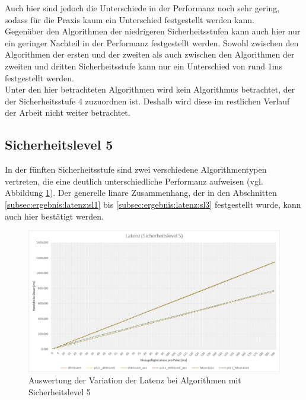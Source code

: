 		Auch hier sind jedoch die Unterschiede in der Performanz noch sehr gering, sodass für die Praxis kaum 				ein Unterschied festgestellt werden kann.\\
		
		Gegenüber den Algorithmen der niedrigeren Sicherheitsstufen kann auch hier nur ein geringer Nachteil in 		der Performanz festgestellt werden. Sowohl zwischen den Algorithmen der ersten und der zweiten als auch 		zwischen den Algorithmen der zweiten und dritten Sicherheitsstufe kann nur ein Unterschied von rund 1ms 		festgestellt werden.\\
		
		Unter den hier betrachteten Algorithmen wird kein Algorithmus betrachtet, der der Sicherheitsstufe 4 				zuzuordnen ist. Deshalb wird diese im restlichen Verlauf der Arbeit nicht weiter betrachtet.
		
		\subsection{Sicherheitslevel 5}
		\label{subsec:ergebnis:latenz:sl5}
		
		In der fünften Sicherheitsstufe sind zwei verschiedene Algorithmentypen vertreten, die eine deutlich 				unterschiedliche Performanz aufweisen (vgl. Abbildung \ref{fig:ergebnis:latenz:sl5}). Der generelle 				linare Zusammenhang, der in den Abschnitten \ref{subsec:ergebnis:latenz:sl1} bis 									\ref{subsec:ergebnis:latenz:sl3} festgestellt wurde, kann auch hier bestätigt werden.
		
		\begin{figure}[htbp]
			\centering
			\includegraphics[width=\textwidth]{../auswertung/latenz_sl5.png}
			\caption{Auswertung der Variation der Latenz bei Algorithmen mit Sicherheitslevel 5}
			\label{fig:ergebnis:latenz:sl5}
		\end{figure}
		
